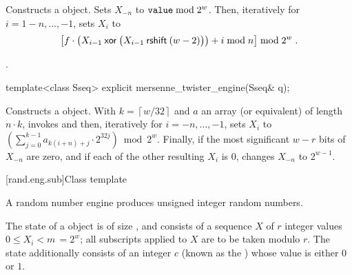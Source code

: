 \begin{itemdescr}
\pnum\effects Constructs a  object.
Sets $X_{-n}$ to $\texttt{value} \bmod 2^w$.
Then, iteratively for $i = 1 - n, \dotsc, -1$, sets $X_i$ to
\[%
 \bigl[f \cdot
       \bigl(X_{i-1} \xor \bigl(X_{i-1} \rightshift (w-2)\bigr)
       \bigr)
       + i \bmod n
 \bigr] \bmod 2^w
\; \mbox{.}
\]%

\pnum\complexity {}.
\end{itemdescr}

%
\begin{itemdecl}
template<class Sseq> explicit mersenne_twister_engine(Sseq& q);
\end{itemdecl}

\begin{itemdescr}
\pnum\effects Constructs a  object.
 With
 $k = \left\lceil w / 32 \right\rceil$
 and $a$ an array (or equivalent)
 of length $n \cdot k$,
 invokes 
 and then, iteratively for $i = -n,\dotsc,-1$,
 sets $X_i$
 to $\left(\sum_{j=0}^{k-1}a_{k(i+n)+j} \cdot 2^{32j} \right) \bmod 2^w$.
 Finally,
 if the most significant $w-r$ bits of $X_{-n}$
 are zero,
 and if each of the other resulting $X_i$ is $0$,
 changes $X_{-n}$
 to $ 2^{w-1} $.
\end{itemdescr}


[rand.eng.sub]{Class template }%
%

\pnum
A  random number engine
produces unsigned integer random numbers.

\pnum
The state%
%
of a  object 
is of size
,
and consists of
a sequence $X$ of $r$ integer values $0 \leq X_i < m \,= 2^w$;
all subscripts applied to $X$ are to be taken modulo $r$.
The state 
additionally consists of an integer $c$
(known as the )%
%
whose value is either $0$ or $1$.

